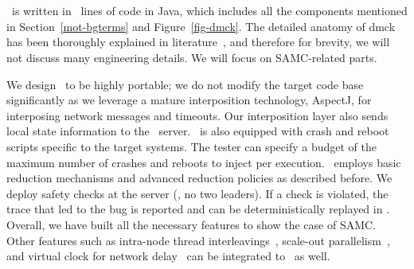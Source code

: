 


\section{\sampro}
\label{imp-pro}

\sampro\ is written in \numLinesSamPro\ lines of code in Java, which
includes all the components mentioned in Section~\ref{mot-bgterms} and
Figure~\ref{fig-dmck}.  The detailed anatomy of dmck has been
thoroughly explained in literature~\cite{Guerraoui+11-McNoNetwork,
  Guo+11-Demeter, Killian+07-LifeDeathMaceMC, Simsa+10-Dbug,
  Yang+09-Modist}, and therefore for brevity, we will not discuss many
engineering details.  We will focus on SAMC-related parts.

We design \sampro\ to be highly portable; we do not modify the target code
base significantly as we leverage a mature interposition technology,
AspectJ, for interposing network messages and timeouts.
Our interposition layer also sends local state information to the
\sampro\ server.
\sampro\ is also equipped with crash and reboot scripts specific to the
target systems.  The tester can specify a budget of the maximum number of
crashes and reboots to inject per execution.
\sampro\ employs basic reduction mechanisms and advanced reduction policies
as described before.
We deploy safety checks at the server (\eg, no two leaders).  If a
check is violated, the trace that led to the bug is reported and 
can be deterministically replayed in \sampro.
Overall, we have built all the necessary features to show the case of
SAMC.  Other features such as intra-node thread
interleavings~\cite{Guo+11-Demeter}, scale-out
parallelism~\cite{Simsa+12-ScalablePOR}, and virtual clock for network
delay~\cite{Yang+09-Modist} can be integrated to \sampro\ as well.

